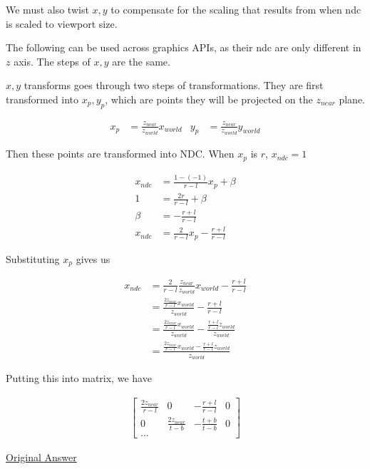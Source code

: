     We must also twist $ x, y $ to compensate for the scaling that results
    from when \acrshort{ndc} is scaled to viewport size.

    The following can be used across graphics APIs, as their \acrshort{ndc}
    are only different in $ z $ axis. The steps of $ x, y $ are the same.

    $ x, y $ transforms goes through two steps of transformations.
    They are first transformed into $ x_{p}, y_{p} $, which are points they
    will be projected on the $ z_{near} $ plane.

    \begin{align*}
      x_{p} &= \frac{z_{near}}{z_{world}} x_{world} & y_{p} &= \frac{z_{near}}{z_{world}} y_{world}
    \end{align*}

    Then these points are transformed into NDC. When $ x_{p} $ is $ r $,
    $ x_{ndc} = 1 $

    \begin{align*}
      x_{ndc} &= \frac{1 - \left( -1 \right)}{r - l} x_{p} + \beta \\
      1 &= \frac{2r}{r - l} + \beta \\
      \beta &= - \frac{r + l}{r - l} \\
      x_{ndc} &= \frac{2}{r - l} x_{p} - \frac{r + l}{r - l}
    \end{align*}

    Substituting $ x_{p} $ gives us

    \begin{align*}
      x_{ndc}
        &= \frac{2}{r - l} \frac{z_{near}}{z_{world}} x_{world} - \frac{r + l}{r - l} \\
        &= \frac{\frac{2 z_{near}}{r - l} x_{world}}{z_{world}} - \frac{r + l}{r - l} \\
        &= \frac{\frac{2 z_{near}}{r - l} x_{world}}{z_{world}} - \frac{\frac{r + l}{r - l} z_{world}}{z_{world}} \\
        &= \frac{\frac{2 z_{near}}{r - l} x_{world} - \frac{r + l}{r - l} z_{world} }{z_{world}}
    \end{align*}

    Putting this into matrix, we have

    \begin{align*}
      \begin{bmatrix}
        \frac{2 z_{near}}{r - l} & 0 & -\frac{r + l}{r - l} & 0 \\
        0 & \frac{2 z_{near}}{t - b} & -\frac{t + b}{t - b} & 0 \\
        ...
      \end{bmatrix}
    \end{align*}

    \href{http://www.songho.ca/opengl/gl_projectionmatrix.html}{Original Answer}
